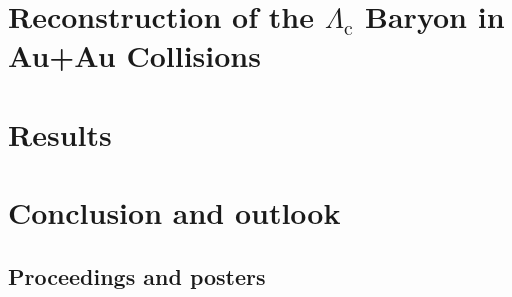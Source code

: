 \documentclass[a4paper,titlepage,11pt,twoside,openright]{report} %
\newcommand{\Listofabbrev}{
                           \printnomenclature
                           \newpage
                          }
\newcommand{\Lambdac}{\ensuremath{\Lambda_\text{c}}}
\begin{document}
\cleardoublepage
\chapter{Reconstruction of the $\Lambda_\text{c}$ Baryon in Au+Au Collisions}


\cleardoublepage
\chapter{Results}


\cleardoublepage
\chapter{Conclusion and outlook} \label{conclusion}



 \cleardoublepage

\Listofabbrev \newpage

\cleardoublepage


\cleardoublepage
\begin{appendices}
\chapter{Proceedings and posters}

\end{appendices}
\end{document}
